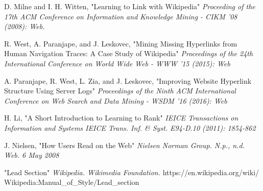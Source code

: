 \begin{thebibliography}{99} %
	
	D. Milne and I. H. Witten,
	\newblock "Learning to Link with Wikipedia"
	\newblock \emph{ Proceeding of the 17th ACM Conference on Information and Knowledge Mining - CIKM '08 (2008): Web.}
	
	R. West, A. Paranjape, and J. Leskovec,
	\newblock "Mining Missing Hyperlinks from Human Navigation Traces: A Case Study of Wikipedia"
	\newblock \emph{Proceedings of the 24th International Conference on World Wide Web - WWW '15 (2015): Web}
		
	A. Paranjape, R. West, L. Zia, and J. Leskovec,
	\newblock "Improving Website Hyperlink Structure Using Server Logs"
	\newblock \emph{Proceedings of the Ninth ACM International Conference on Web Search and Data Mining - WSDM '16 (2016): Web}

	H. Li,
	\newblock "A Short Introduction to Learning to Rank"
	\newblock \emph{IEICE Transactions on Information and Systems IEICE Trans. Inf. \& Syst. E94-D.10 (2011): 1854-862}
	
	J. Nielsen,
	\newblock "How Users Read on the Web"
	\newblock \emph{Nielsen Norman Group. N.p., n.d. Web. 6 May 2008}

	"Lead Section"
	\newblock \emph{Wikipedia. Wikimedia Foundation.}
	\newblock https://en.wikipedia.org/wiki/ \\ Wikipedia:Manual\_of\_Style/Lead\_section
	
\end{thebibliography}
